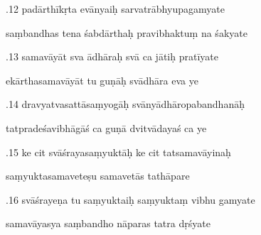 \documentclass[article,12pt,a4paper]{memoir}%
\newcounter{parCount}
\begin{document}
	  
	  \pstart {}.12 padārthīkṛta evānyaiḥ sarvatrābhyupagamyate 
	{}
	\pend%
      

	  
	  \pstart \leavevmode%
	saṃbandhas tena śabdārthaḥ pravibhaktuṃ na śakyate 
	{}
	\pend%
      

	  
	  \pstart {}.13 samavāyāt sva ādhāraḥ svā ca jātiḥ pratīyate 
	{}
	\pend%
      

	  
	  \pstart \leavevmode%
	ekārthasamavāyāt tu guṇāḥ svādhāra eva ye 
	{}
	\pend%
      

	  
	  \pstart {}.14 dravyatvasattāsaṃyogāḥ   svānyādhāropabandhanāḥ 
	{}
	\pend%
      

	  
	  \pstart \leavevmode%
	tatpradeśavibhāgāś ca guṇā dvitvādayaś ca ye 
	{}
	\pend%
      

	  
	  \pstart {}.15 ke cit svāśrayasaṃyuktāḥ ke cit tatsamavāyinaḥ 
	{}
	\pend%
      

	  
	  \pstart \leavevmode%
	saṃyuktasamaveteṣu samavetās tathāpare 
	{}
	\pend%
      

	  
	  \pstart {}.16 svāśrayeṇa tu saṃyuktaiḥ saṃyuktaṃ vibhu gamyate 
	{}
	\pend%
      

	  
	  \pstart \leavevmode%
	samavāyasya saṃbandho nāparas tatra dṛśyate 
	{}
	\pend%
      
\end{document}
